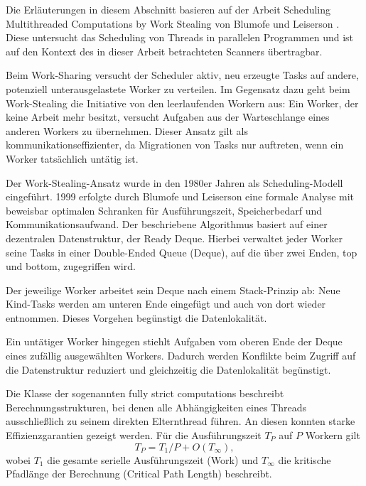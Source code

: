 \begin{sloppypar}
\noindent Die Erläuterungen in diesem Abschnitt basieren auf der Arbeit Scheduling Multithreaded Computations by Work Stealing von Blumofe und Leiserson \cite[S.~721--746]{Blumofe.1999}. 
Diese untersucht das Scheduling von Threads in parallelen Programmen und ist auf den Kontext des in dieser Arbeit betrachteten Scanners übertragbar.

\vspace{7.56mm}

\noindent Beim Work-Sharing versucht der Scheduler aktiv, neu erzeugte Tasks auf andere, potenziell unterausgelastete Worker zu verteilen. 
Im Gegensatz dazu geht beim Work-Stealing die Initiative von den leerlaufenden Workern aus: 
Ein Worker, der keine Arbeit mehr besitzt, versucht Aufgaben aus der Warteschlange eines anderen Workers zu übernehmen.
Dieser Ansatz gilt als kommunikationseffizienter, da Migrationen von Tasks nur auftreten, wenn ein Worker tatsächlich untätig ist.

\vspace{7.56mm}

\noindent Der Work-Stealing-Ansatz wurde in den 1980er Jahren als Scheduling-Modell eingeführt. 
1999 erfolgte durch Blumofe und Leiserson eine formale Analyse mit beweisbar optimalen Schranken für Ausführungszeit,
Speicherbedarf und Kommunikationsaufwand.
Der beschriebene Algorithmus basiert auf einer dezentralen Datenstruktur, 
der Ready Deque.
Hierbei verwaltet jeder Worker seine Tasks in einer Double-Ended Queue (Deque), 
auf die über zwei Enden, top und bottom, zugegriffen wird.
\vspace{7.56mm}

\noindent Der jeweilige Worker arbeitet sein Deque nach einem Stack-Prinzip ab: 
Neue Kind-Tasks werden am unteren Ende eingefügt und auch von dort wieder entnommen. 
Dieses Vorgehen begünstigt die Datenlokalität.

\noindent Ein untätiger Worker hingegen stiehlt Aufgaben vom oberen Ende der Deque eines zufällig ausgewählten Workers. 
Dadurch werden Konflikte beim Zugriff auf die Datenstruktur reduziert und gleichzeitig die Datenlokalität begünstigt.

\vspace{7.56mm}

\noindent Die Klasse der sogenannten fully strict computations beschreibt Berechnungsstrukturen, 
bei denen alle Abhängigkeiten eines Threads ausschließlich zu seinem direkten Elternthread führen. 
An diesen konnten starke Effizienzgarantien gezeigt werden. 
Für die Ausführungszeit $T_P$ auf $P$ Workern gilt
\begin{equation}
T_P = T_1 / P + O(T_\infty),
\end{equation}
\noindent wobei $T_1$ die gesamte serielle Ausführungszeit (Work) und $T_\infty$ die kritische Pfadlänge der Berechnung (Critical Path Length) beschreibt.


\end{sloppypar}
